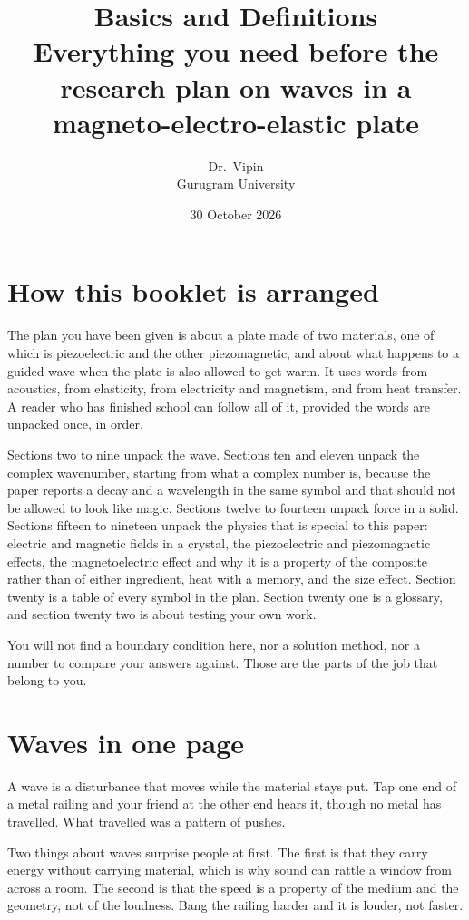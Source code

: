 \documentclass[11pt]{article}
\title{\vspace{-1.6cm}\Large Basics and Definitions\\[2pt]
\large Everything you need before the research plan on waves in a magneto-electro-elastic plate}
\author{Dr.\ Vipin \\ Gurugram University}
\date{30 October 2026}
\begin{document}
\maketitle
\vspace{-6mm}

\section{How this booklet is arranged}

The plan you have been given is about a plate made of two materials, one of which is piezoelectric and the
other piezomagnetic, and about what happens to a guided wave when the plate is also allowed to get warm. It
uses words from acoustics, from elasticity, from electricity and magnetism, and from heat transfer. A reader
who has finished school can follow all of it, provided the words are unpacked once, in order.

Sections two to nine unpack the wave. Sections ten and eleven unpack the complex wavenumber, starting from
what a complex number is, because the paper reports a decay and a wavelength in the same symbol and that
should not be allowed to look like magic. Sections twelve to fourteen unpack force in a solid. Sections fifteen
to nineteen unpack the physics that is special to this paper: electric and magnetic fields in a crystal, the
piezoelectric and piezomagnetic effects, the magnetoelectric effect and why it is a property of the composite
rather than of either ingredient, heat with a memory, and the size effect. Section twenty is a table of every
symbol in the plan. Section twenty one is a glossary, and section twenty two is about testing your own work.

You will not find a boundary condition here, nor a solution method, nor a number to compare your answers
against. Those are the parts of the job that belong to you.

\section{Waves in one page}

A wave is a disturbance that moves while the material stays put. Tap one end of a metal railing and your
friend at the other end hears it, though no metal has travelled. What travelled was a pattern of pushes.

Two things about waves surprise people at first. The first is that they carry energy without carrying
material, which is why sound can rattle a window from across a room. The second is that the speed is a
property of the medium and the geometry, not of the loudness. Bang the railing harder and it is louder, not
faster.
\end{document}
